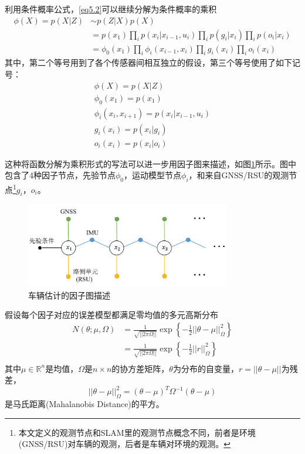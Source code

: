 利用条件概率公式，\eqref{eq5.2}可以继续分解为条件概率的乘积
\begin{equation}
    \begin{aligned}
        \phi(X)=p(X|Z)
        &\sim p(Z|X)p(X)\\
        &= p(x_1)\prod\limits_ip(x_{i}|x_{i-1},u_i)\prod\limits_ip(g_i|x_i)\prod\limits_ip(o_i|x_i)\\
        &= \phi_0(x_1)\prod\limits_i\phi_i(x_{i-1},x_i)\prod\limits_ig_i(x_i)\prod\limits_io_i(x_i)
    \end{aligned}
\end{equation}
其中，第二个等号用到了各个传感器间相互独立的假设，第三个等号使用了如下记号：
\begin{gather}
    \phi(X)=p(X|Z)\\
    \phi_0(x_1)=p(x_1)\\
    \phi_i(x_i,x_{i+1})=p(x_{i}|x_{i-1},u_i)\\
    g_i(x_i)=p(x_i|g_i)\\
    o_i(x_i)=p(x_i|o_i)
\end{gather}

这种将函数分解为乘积形式的写法可以进一步用因子图来描述，如图\ref{fig28}所示。图中包含了4种因子节点，先验节点$\phi_0$，运动模型节点$\phi_i$，和来自GNSS/RSU的观测节点\footnote[1]{本文定义的观测节点和SLAM里的观测节点概念不同，前者是环境(GNSS/RSU)对车辆的观测，后者是车辆对环境的观测。}$g_i$，$o_i$。

\begin{figure}[htb] 
    \center
    \includegraphics[width=0.8\textwidth]{figure/fig28.png}
    \caption{车辆估计的因子图描述}
    \label{fig28}
\end{figure}

假设每个因子对应的误差模型都满足零均值的多元高斯分布
\begin{equation}
    \begin{aligned}
        N(\theta;\mu,\Omega)&=\frac{1}{\sqrt{||2\pi\Omega||}}\exp\left\{-\frac{1}{2}||\theta-\mu||^2_\Omega\right\}\\
        &=\frac{1}{\sqrt{||2\pi\Omega||}}\exp\left\{-\frac{1}{2}||r||^2_\Omega\right\}\\
    \end{aligned}
\end{equation}
其中$\mu\in\mathbb{R}^n$是均值，$\Omega$是$n\times n$的协方差矩阵，$\theta$为分布的自变量，$r=||\theta-\mu||$为残差，
\begin{equation}
    ||\theta-\mu||^2_\Omega=(\theta-\mu)^T\Omega^{-1}(\theta-\mu)
\end{equation}
是马氏距离(Mahalanobis Distance)的平方。

